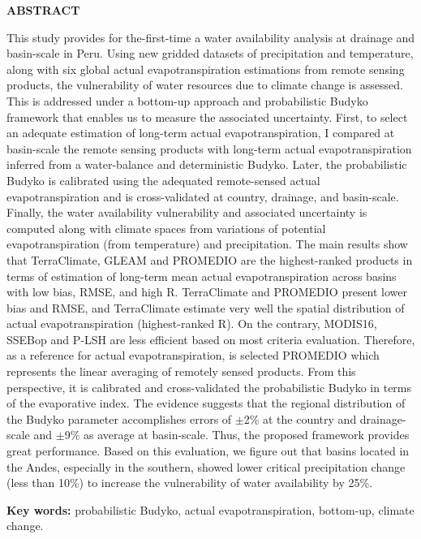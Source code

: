 \clearpage

\begin{center}
\large{\textbf {ABSTRACT}}
\end{center}

This study provides for the-first-time a water availability analysis at drainage and basin-scale in Peru. Using new gridded datasets of precipitation and temperature, along with six global actual evapotranspiration estimations from remote sensing products, the vulnerability of water resources due to climate change is assessed. This is addressed under a bottom-up approach and probabilistic Budyko framework that enables us to measure the associated uncertainty. First, to select an adequate estimation of long-term actual evapotranspiration, I compared at basin-scale the remote sensing products with long-term actual evapotranspiration inferred from a water-balance and deterministic Budyko. Later, the probabilistic Budyko is calibrated using the adequated remote-sensed actual evapotranspiration and is cross-validated at country, drainage, and basin-scale. Finally, the water availability vulnerability and associated uncertainty is computed along with climate spaces from variations of potential evapotranspiration (from temperature) and precipitation. The main results show that TerraClimate, GLEAM and PROMEDIO are the highest-ranked products in terms of estimation of long-term mean actual evapotranspiration across basins with low bias, RMSE, and high R. TerraClimate and PROMEDIO present lower bias and RMSE, and TerraClimate estimate very well the spatial distribution of actual evapotranspiration (highest-ranked R). On the contrary, MODIS16, SSEBop and P‐LSH are less efficient based on most criteria evaluation. Therefore, as a reference for actual evapotranspiration, is selected PROMEDIO which represents the linear averaging of remotely sensed products. From this perspective, it is calibrated and cross-validated the probabilistic Budyko in terms of the evaporative index. The evidence suggests that the regional distribution of the Budyko parameter accomplishes errors of $\pm$2\% at the country and drainage-scale and $\pm$9\% as average at basin-scale. Thus, the proposed framework provides great performance. Based on this evaluation, we figure out that basins located in the Andes, especially in the southern, showed lower critical precipitation change (less than 10\%) to increase the vulnerability of water availability by 25\%.

\textbf {Key words:} probabilistic Budyko, actual evapotranspiration, bottom-up, climate change.

\clearpage